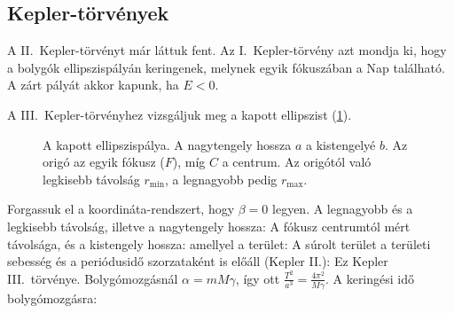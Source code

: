   \subsection{Kepler-törvények}
   
   A II.\ Kepler-törvényt már láttuk fent.
   Az I.\ Kepler-törvény azt mondja ki, hogy a bolygók ellipszispályán keringenek, melynek egyik fókuszában a Nap található.
   A zárt pályát akkor kapunk, ha $E<0$. 
   
   A III.\ Kepler-törvényhez vizsgáljuk meg a kapott ellipszist (\ref{fig:A13-ellipszis}).
   \begin{figure}[ht!]
    \centering
    \caption{A kapott ellipszispálya.
   A nagytengely hossza $a$ a kistengelyé $b$.
   Az origó az egyik fókusz ($F$), míg $C$ a centrum.
   Az origótól való legkisebb távolság $r_\text{min}$, a legnagyobb pedig $r_\text{max}$.}\label{fig:A13-ellipszis}
   \end{figure}
   Forgassuk el a koordináta-rendszert, hogy $\beta=0$ legyen.
   A legnagyobb és a legkisebb távolság, illetve a nagytengely hossza:
   A fókusz centrumtól mért távolsága, és a kistengely hossza:
   amellyel a terület:
   A súrolt terület a területi sebesség és a periódusidő szorzataként is előáll (Kepler II{.}):
   Ez Kepler III.\ törvénye.
   Bolygómozgásnál $\alpha=mM\gamma$, így ott $\frac{T^2}{a^3}=\frac{4\pi^2}{M\gamma}$.
   A keringési idő bolygómozgásra:
 
